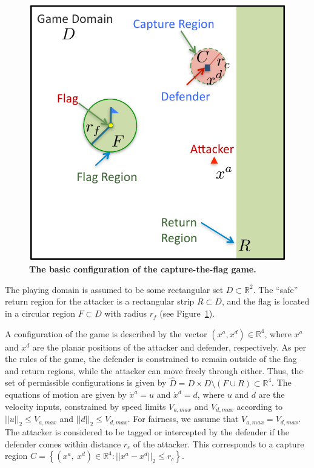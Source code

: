 \documentclass[letterpaper, 10 pt, conference]{ieeeconf}  %
\numberwithin{algorithm}{section}
\newcommand{\R}{\mathbb{R}}
\begin{document}
\begin{figure}[t]
	\centering
	\includegraphics[width=0.9\columnwidth]{figures/gameDiagram}
	\caption{\textbf{The basic configuration of the capture-the-flag game.}}
	\label{fig:gameDiagram}
\end{figure}

The playing domain is assumed to be some rectangular set $D \subset \R^2$. The ``safe'' return region for the attacker is a rectangular strip $R \subset D$, and the flag is located in a circular region $F \subset D$ with radius $r_f$ (see Figure~\ref{fig:gameDiagram}). 

A configuration of the game is described by the vector $(x^a,x^d) \in \mathbb{R}^4$, where $x^a$ and $x^d$ are the planar positions of the attacker and defender, respectively. As per the rules of the game, the defender is constrained to remain outside of the flag and return regions, while the attacker can move freely through either. Thus, the set of permissible configurations is given by $\hat{D} = D \times D \setminus (F \cup R) \subset \R^4$. The equations of motion are given by $\dot{x}^a = u$ and $\dot{x}^d = d$, where $u$ and $d$ are the velocity inputs, constrained by speed limits $V_{a,max}$ and $V_{d,max}$ according to  $|| u ||_2 \leq V_{a,max}$ and $|| d ||_2 \leq V_{d,max}$. For fairness, we assume that $V_{a,max} = V_{d, max}$.  The attacker is considered to be tagged or intercepted by the defender if the defender comes within distance $r_c$ of the attacker. This corresponds to a capture region $C = \left\{ (x^a,\ x^d) \in \mathbb{R}^4:  ||x^a - x^d||_2 \leq r_c\right\}$.
\end{document}
